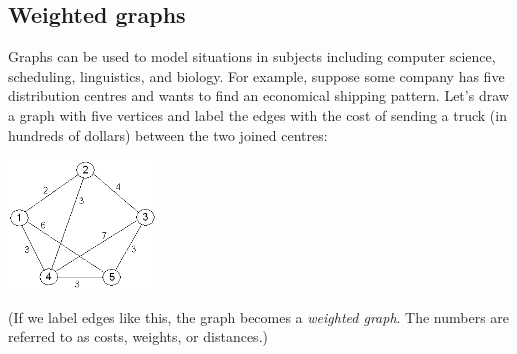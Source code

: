 \subsection*{Weighted graphs}
Graphs can be used to model situations in subjects including computer science, scheduling, linguistics, and biology. For example,
suppose some company has five distribution centres and wants to find an economical shipping pattern. Let's draw a graph with five
vertices and label the edges with the cost of sending a truck (in hundreds of dollars) between the two joined centres:
\begin{center}
  \includegraphics[width=0.3\textwidth]{graph1}
\end{center}
(If we label edges like this, the graph becomes a \emph{weighted graph}. The numbers are referred to as costs, weights, or distances.)

